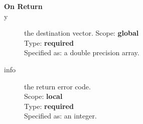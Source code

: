 \begin{description}
\item[\bf On Return]
\item[y] the destination vector.
Scope: {\bf global} \\
Type: {\bf required}\\
Specified as: a double precision array.
\item[info] the return error code.\\
Scope: {\bf local} \\
Type: {\bf required}\\
Specified as: an integer.\\
\end{description}



